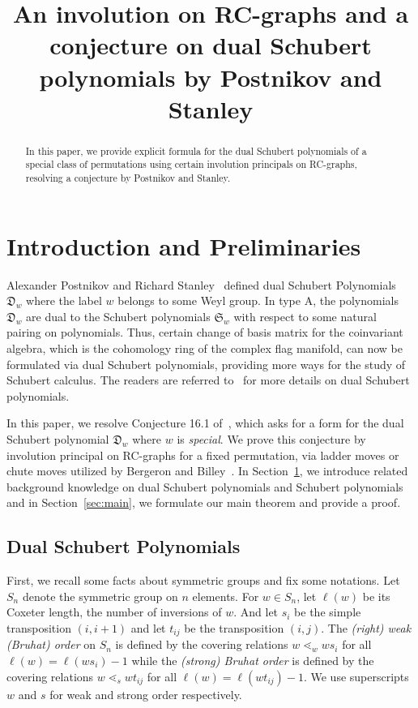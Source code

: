 \documentclass[10pt]{amsart}
\author[\initial{Y.} Gao]{\firstname{Yibo} \lastname{Gao}}
\title
[On a Conjecture by Postnikov and Stanley]
{An involution on RC-graphs and a conjecture on dual Schubert polynomials by Postnikov and Stanley}
\newcommand{\D}{\mathfrak{D}}
\begin{document}
\begin{abstract}
In this paper, we provide explicit formula for the dual Schubert polynomials of a special class of permutations using certain involution principals on RC-graphs, resolving a conjecture by Postnikov and Stanley.
\end{abstract}






\maketitle

\section{Introduction and Preliminaries}\label{sec:intro}
Alexander Postnikov and Richard Stanley~\cite{postnikov2009chains} defined dual Schubert Polynomials $\D_w$ where the label $w$ belongs to some Weyl group. In type A, the polynomials $\D_w$ are dual to the Schubert polynomials $\mathfrak{S}_w$ with respect to some natural pairing on polynomials. Thus, certain change of basis matrix for the coinvariant algebra, which is the cohomology ring of the complex flag manifold, can now be formulated via dual Schubert polynomials, providing more ways for the study of Schubert calculus. The readers are referred to~\cite{postnikov2009chains} for more details on dual Schubert polynomials.

In this paper, we resolve Conjecture 16.1 of~\cite{postnikov2009chains}, which asks for a form for the dual Schubert polynomial $\D_w$ where $w$ is \emph{special}. We prove this conjecture by involution principal on RC-graphs for a fixed permutation, via ladder moves or chute moves utilized by Bergeron and Billey~\cite{bergeron1993rc}. In Section~\ref{sec:intro}, we introduce related background knowledge on dual Schubert polynomials and Schubert polynomials and in Section~\ref{sec:main}, we formulate our main theorem and provide a proof. 


\subsection{Dual Schubert Polynomials}

First, we recall some facts about symmetric groups and fix some notations. Let $S_n$ denote the symmetric group on $n$ elements. For $w\in S_n$, let $\ell(w)$ be its Coxeter length, \ie the number of inversions of $w$. And let $s_i$ be the simple transposition $(i,i+1)$ and let $t_{ij}$ be the transposition $(i,j)$. The \emph{(right) weak (Bruhat) order} on $S_n$ is defined by the covering relations $w\lessdot_w ws_i$ for all $\ell(w)=\ell(ws_i)-1$ while the \emph{(strong) Bruhat order} is defined by the covering relations $w\lessdot_s wt_{ij}$ for all $\ell(w)=\ell(wt_{ij})-1$. We use superscripts $w$ and $s$ for weak and strong order respectively. 
\end{document}
